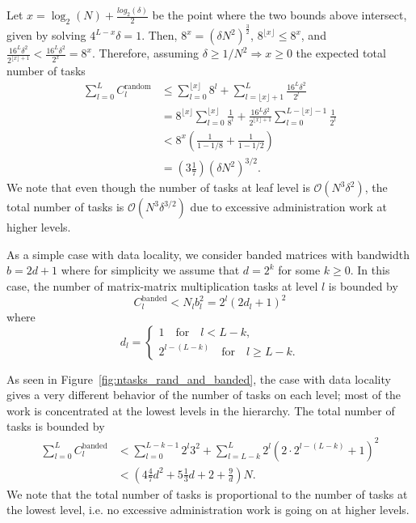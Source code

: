 \documentclass{elsarticle}
\begin{document}
Let $x = \log_2(N) + \frac{log_2(\delta)}{2}$ be the point where the two
bounds above intersect, given by solving $4^{L-x}\delta = 1$. Then, 
$8^x = (\delta N^2)^\frac{3}{2}$,
$8^{\lfloor x \rfloor} \leq 8^x$, and
$\frac{16^L\delta^2}{2^{\lfloor x \rfloor+1}} < \frac{16^L\delta^2}{2^{x}} =  8^x$. Therefore,
assuming $\delta \geq 1/N^2 \Longrightarrow x\geq 0$ the expected total number of tasks
\begin{align}
  \sum_{l = 0}^L C_l^{\mathrm{random}} & \leq \sum_{l = 0}^{\lfloor x \rfloor} 8^l + \sum_{l = {\lfloor x \rfloor}+1}^L \frac{16^L\delta^2}{2^l} \\
  & = 8^{\lfloor x \rfloor} \sum_{l = 0}^{\lfloor x \rfloor} \frac{1}{8^l} 
  + \frac{16^L\delta^2}{2^{\lfloor x \rfloor+1}} \sum_{l = 0}^{L-\lfloor x \rfloor-1} \frac{1}{2^l} \\
  & < 8^x \left( \frac{1}{1-1/8} + \frac{1}{1-1/2} \right) \\
  & = (3\tfrac{1}{7})(\delta N^2)^{3/2}.
\end{align}
We note that even though the number of tasks at leaf level is
$\mathcal{O}(N^3\delta^2)$, the total number of tasks is
$\mathcal{O}(N^3\delta^{3/2})$ due to excessive administration work at
higher levels.

As a simple case with data locality, we consider banded matrices with
bandwidth $b = 2d + 1$ where for simplicity we assume that $d = 2^k$
for some $k \geq 0$. In this case, the number of matrix-matrix
multiplication tasks at level $l$ is bounded by
\begin{equation}\label{eq:no_of_mmul_tasks_at_level_banded}
C_l^{\mathrm{banded}} < N_l b_l^2 = 2^l (2 d_l + 1)^2
\end{equation}
where
\begin{equation}
  d_l=\begin{cases}
  1          \quad \mathrm{for} \quad l < L-k, \\
  2^{l-(L-k)}  \quad \mathrm{for} \quad l \geq L-k.
  \end{cases}
\end{equation}

As seen in Figure~\ref{fig:ntasks_rand_and_banded}, the case with data
locality gives a very different behavior of the number of tasks on
each level; most of the work is concentrated at the lowest levels in
the hierarchy.
The total number of tasks is bounded by 
\begin{align}
  \sum_{l=0}^L C_l^{\mathrm{banded}} 
  & < \sum_{l=0}^{L-k-1} 2^l 3^2 + \sum_{l=L-k}^{L} 2^l(2 \cdot 2^{l-(L-k)}+1)^2 \\
  & < (4\tfrac{4}{7}d^2+5\tfrac{1}{3}d+2+\frac{9}{d})N.
\end{align}
We note that the total number of tasks is proportional to the number
of tasks at the lowest level, i.e. no excessive administration work is
going on at higher levels.
\end{document}
